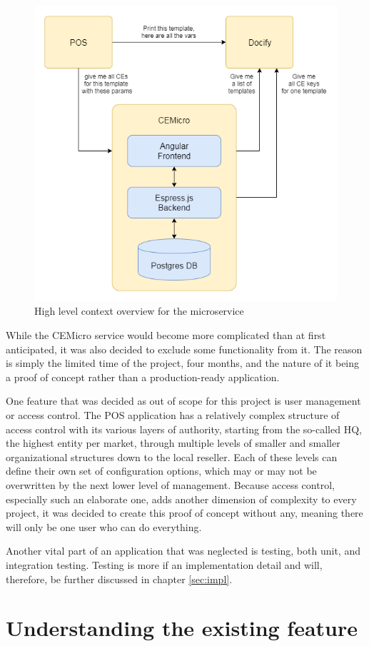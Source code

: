 \begin{figure}
  \centering
  \includegraphics[width=0.6\linewidth]{assets/high-level-overview.png}
  \caption{High level context overview for the microservice}
  \label{fig:context}
\end{figure}

While the CEMicro service would become more complicated than at first anticipated, it was also decided to exclude some functionality from it. The reason is simply the limited time of the project, four months, and the nature of it being a proof of concept rather than a production-ready application.

One feature that was decided as out of scope for this project is user management or access control. The POS application has a relatively complex structure of access control with its various layers of authority, starting from the so-called HQ, the highest entity per market, through multiple levels of smaller and smaller organizational structures down to the local reseller. Each of these levels can define their own set of configuration options, which may or may not be overwritten by the next lower level of management. Because access control, especially such an elaborate one, adds another dimension of complexity to every project, it was decided to create this proof of concept without any, meaning there will only be one user who can do everything.

Another vital part of an application that was neglected is testing, both unit, and integration testing. Testing is more if an implementation detail and will, therefore, be further discussed in chapter \ref{sec:impl}.


\section{Understanding the existing feature}
\label{sec:arch:understanding}


